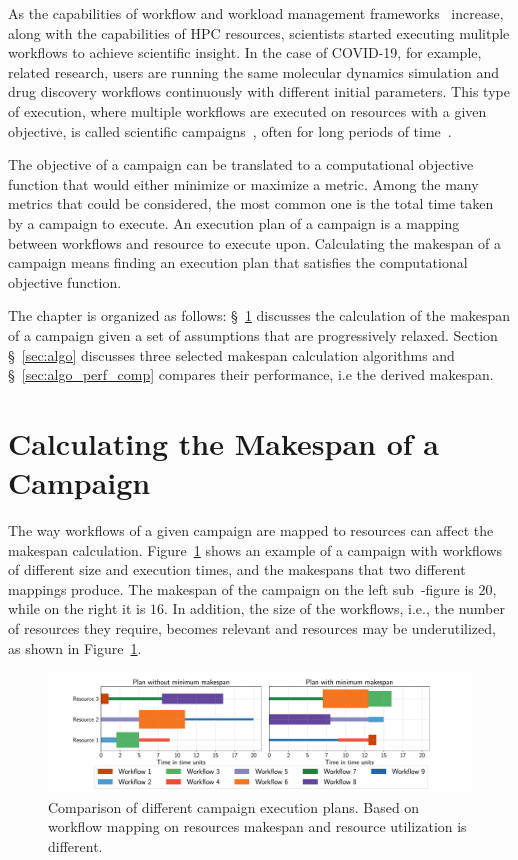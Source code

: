 \label{ch:campaigns}
As the capabilities of workflow and workload management frameworks~\cite{balasubramanian2018harnessing,deelman2015pegasus,maeno2008panda} increase, along with the capabilities of HPC resources, scientists started executing mulitple workflows to achieve scientific insight.
In the case of COVID-19, for example, related research, users are running the same molecular dynamics simulation and drug discovery workflows continuously with different initial parameters.
This type of execution, where multiple workflows are executed on resources with a given objective, is called scientific campaigns~\cite{maeno2008panda}, often for long periods of time~\cite{casajus2010dirac}.

The objective of a campaign can be translated to a computational objective function that would either minimize or maximize a metric.
Among the many metrics that could be considered, the most common one is the total time taken by a campaign to execute.
An execution plan of a campaign is a mapping between workflows and resource to execute upon.
Calculating the makespan of a campaign means finding an execution plan that satisfies the computational objective function.

The chapter is organized as follows: \S~\ref{sec:makespan_calc} discusses the calculation of the makespan of a campaign given a set of assumptions that are progressively relaxed.
Section \S~\ref{sec:algo} discusses three selected makespan calculation algorithms and \S~\ref{sec:algo_perf_comp} compares their performance, i.e the derived makespan.

\section{Calculating the Makespan of a Campaign}
\label{sec:makespan_calc}
The way workflows of a given campaign are mapped to resources can affect the makespan calculation. 
Figure~\ref{fig:example_makespan} shows an example of a campaign with workflows of different size and execution times, and the makespans that two different mappings produce.
The makespan of the campaign on the left sub~-figure is $20$, while on the right it is $16$.
In addition, the size of the workflows, i.e., the number of resources they require, becomes relevant and resources may be underutilized, as shown in Figure~\ref{fig:example_makespan}.

\begin{figure}[ht!]
    \centering
    \includegraphics[width=.99\textwidth]{figures/campaign/plan_comp.pdf}
    \caption{Comparison of different campaign execution plans. Based on workflow mapping on resources makespan and resource utilization is different.}\label{fig:example_makespan}
\end{figure}

